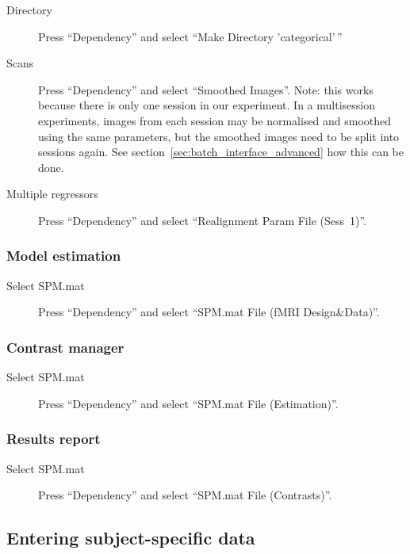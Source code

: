 \begin{description}
\item[Directory] Press ``Dependency'' and select ``Make Directory
  'categorical'\,''
\item[Scans] Press ``Dependency'' and select ``Smoothed Images''. Note: this
  works because there is only one session in our experiment. In a
  multisession experiments, images from each session may be normalised and
  smoothed using the same parameters, but the smoothed images need to be
  split into sessions again. See section~\ref{sec:batch_interface_advanced}
  how this can be done.
\item[Multiple regressors] Press ``Dependency'' and select ``Realignment
  Param File (Sess~1)''.
\end{description}

\subsubsection*{Model estimation}

\begin{description}
\item[Select SPM.mat] Press ``Dependency'' and select ``SPM.mat File (fMRI
  Design\&Data)''.
\end{description}

\subsubsection*{Contrast manager}

\begin{description}
\item[Select SPM.mat] Press ``Dependency'' and select ``SPM.mat File
  (Estimation)''. 
\end{description}

\subsubsection*{Results report}

\begin{description}
\item[Select SPM.mat] Press ``Dependency'' and select ``SPM.mat File
  (Contrasts)''. 
\end{description}

\subsection{Entering subject-specific data}


